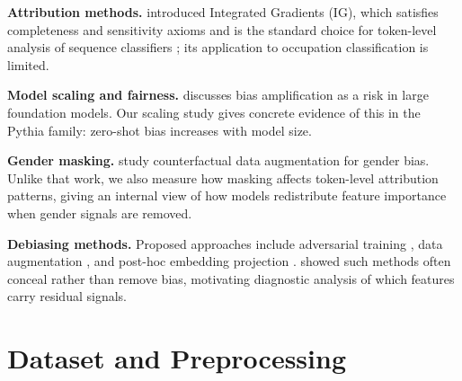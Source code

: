 \documentclass[11pt]{article}
\begin{document}
\textbf{Attribution methods.}
\citet{sundararajan2017axiomatic} introduced Integrated Gradients (IG),
which satisfies completeness and sensitivity axioms and is the standard
choice for token-level analysis of sequence classifiers
\citep{attanasio2022entropy}; its application to occupation
classification is limited.

\textbf{Model scaling and fairness.}
\citet{bommasani2021opportunities} discusses bias amplification as a risk
in large foundation models. Our scaling study gives concrete evidence of
this in the Pythia family: zero-shot bias increases with model size.

\textbf{Gender masking.}
\citet{lu-etal-2020-gender} study counterfactual data augmentation for
gender bias. Unlike that work, we also measure how masking affects
token-level attribution patterns, giving an internal view of how models
redistribute feature importance when gender signals are removed.

\textbf{Debiasing methods.}
Proposed approaches include adversarial training \citep{zhao-etal-2018-gender},
data augmentation \citep{lu-etal-2020-gender}, and post-hoc embedding projection
\citep{sun-etal-2019-mitigating}.
\citet{gonen-goldberg-2019-lipstick} showed such methods often conceal rather
than remove bias, motivating diagnostic analysis of which features carry
residual signals.

\section{Dataset and Preprocessing}
\end{document}
